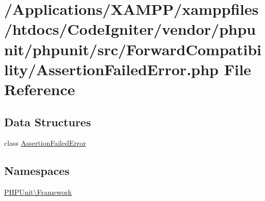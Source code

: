 \hypertarget{_forward_compatibility_2_assertion_failed_error_8php}{}\section{/\+Applications/\+X\+A\+M\+P\+P/xamppfiles/htdocs/\+Code\+Igniter/vendor/phpunit/phpunit/src/\+Forward\+Compatibility/\+Assertion\+Failed\+Error.php File Reference}
\label{_forward_compatibility_2_assertion_failed_error_8php}
\subsection*{Data Structures}
\begin{DoxyCompactItemize}
\item 
class \mbox{\hyperlink{class_p_h_p_unit_1_1_framework_1_1_assertion_failed_error}{Assertion\+Failed\+Error}}
\end{DoxyCompactItemize}
\subsection*{Namespaces}
\begin{DoxyCompactItemize}
\item 
 \mbox{\hyperlink{namespace_p_h_p_unit_1_1_framework}{P\+H\+P\+Unit\textbackslash{}\+Framework}}
\end{DoxyCompactItemize}
